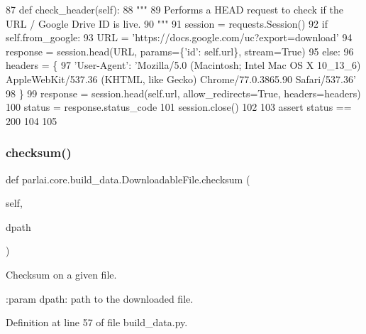 \begin{DoxyCode}
87     \textcolor{keyword}{def }check\_header(self):
88         \textcolor{stringliteral}{"""}
89 \textcolor{stringliteral}{        Performs a HEAD request to check if the URL / Google Drive ID is live.}
90 \textcolor{stringliteral}{        """}
91         session = requests.Session()
92         \textcolor{keywordflow}{if} self.from\_google:
93             URL = \textcolor{stringliteral}{'https://docs.google.com/uc?export=download'}
94             response = session.head(URL, params=\{\textcolor{stringliteral}{'id'}: self.url\}, stream=\textcolor{keyword}{True})
95         \textcolor{keywordflow}{else}:
96             headers = \{
97                 \textcolor{stringliteral}{'User-Agent'}: \textcolor{stringliteral}{'Mozilla/5.0 (Macintosh; Intel Mac OS X 10\_13\_6) AppleWebKit/537.36 (KHTML,
       like Gecko) Chrome/77.0.3865.90 Safari/537.36'}
98             \}
99             response = session.head(self.url, allow\_redirects=\textcolor{keyword}{True}, headers=headers)
100         status = response.status\_code
101         session.close()
102 
103         \textcolor{keyword}{assert} status == 200
104 
105 
\end{DoxyCode}
\mbox{\label{classparlai_1_1core_1_1build__data_1_1DownloadableFile_aa69730e15f7f4a535e01e126ceb87f9d}} 
\subsubsection{\texorpdfstring{checksum()}{checksum()}}
{\footnotesize\ttfamily def parlai.\+core.\+build\+\_\+data.\+Downloadable\+File.\+checksum (\begin{DoxyParamCaption}\item[{}]{self,  }\item[{}]{dpath }\end{DoxyParamCaption})}

\begin{DoxyVerb}Checksum on a given file.

:param dpath: path to the downloaded file.
\end{DoxyVerb}
 

Definition at line 57 of file build\+\_\+data.\+py.


